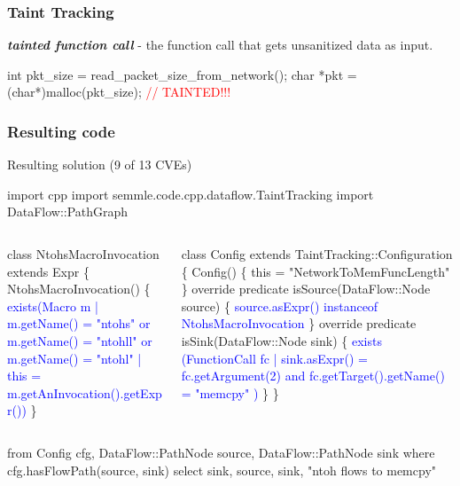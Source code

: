 \documentclass[usenames,dvipsnames]{beamer}
\newcommand{\bluealert}[1] {\alert{\textcolor{blue}{#1}}}
\newcommand{\redalert}[1] {\alert{\textcolor{red}{#1}}}
\begin{document}
\begin{frame}[fragile]
\frametitle{Taint Tracking}
\textbf{\textit{tainted function call}} - the function call that gets unsanitized data as input.
\\
\begin{semiverbatim}
int pkt_size = read_packet_size_from_network(); 
char *pkt = (char*)malloc(pkt_size); \redalert{// TAINTED!!!}
\end{semiverbatim}
\end{frame}

\begin{frame}[fragile]
\frametitle{Resulting code}
Resulting solution (9 of 13 CVEs)
\tiny
\begin{semiverbatim}
import cpp
import semmle.code.cpp.dataflow.TaintTracking
import DataFlow::PathGraph
\end{semiverbatim}
\begin{columns}
\begin{column}{0.5\textwidth}
\begin{semiverbatim}
class NtohsMacroInvocation extends Expr \{
  NtohsMacroInvocation() \{ 
      \bluealert{exists(Macro m | m.getName() = "ntohs"  or}
      \bluealert{  m.getName() = "ntohll" or}
      \bluealert{    m.getName() = "ntohl"}
      \bluealert{  | this = m.getAnInvocation().getExpr())  }
  \}
\end{semiverbatim}
\end{column}
\begin{column}{0.5\textwidth}
\begin{semiverbatim}
class Config extends TaintTracking::Configuration \{
  Config() \{ this = "NetworkToMemFuncLength" \}
  override predicate isSource(DataFlow::Node source) \{
    \bluealert{source.asExpr() instanceof NtohsMacroInvocation}
  \}
  override predicate isSink(DataFlow::Node sink) \{
    \bluealert{exists (FunctionCall fc |}
    \bluealert{  sink.asExpr() = fc.getArgument(2) and}
    \bluealert{  fc.getTarget().getName() = "memcpy"}
    \bluealert{)}
  \}
\}
\end{semiverbatim}
\end{column}
\end{columns}
\begin{semiverbatim}
from Config cfg, DataFlow::PathNode source, DataFlow::PathNode sink
where cfg.hasFlowPath(source, sink)
select sink, source, sink, "ntoh flows to memcpy"
\end{semiverbatim}
\end{frame}
\end{document}
